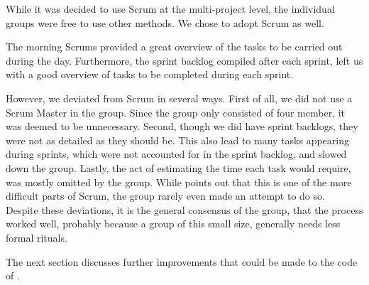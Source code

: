 While it was decided to use Scrum at the multi-project level, the individual groups were free to use other methods.
We chose to adopt Scrum as well.

The morning Scrums provided a great overview of the tasks to be carried out during the day.
Furthermore, the sprint backlog compiled after each sprint, left us with a good overview of tasks to be completed during each sprint.

However, we deviated from Scrum in several ways.
First of all, we did not use a Scrum Master in the group.
Since the group only consisted of four member, it was deemed to be unnecessary.
Second, though we did have sprint backlogs, they were not as detailed as they should be.
This also lead to many tasks appearing during sprints, which were not accounted for in the sprint backlog, and slowed down the group.
Lastly, the act of estimating the time each task would require, was mostly omitted by the group.
While \citet{larmanAgile} points out that this is one of the more difficult parts of Scrum, the group rarely even made an attempt to do so.\\

Despite these deviations, it is the general consensus of the group, that the process worked well, probably because a group of this small size, generally needs less formal rituals.


The next section discusses further improvements that could be made to the code of \launcher.